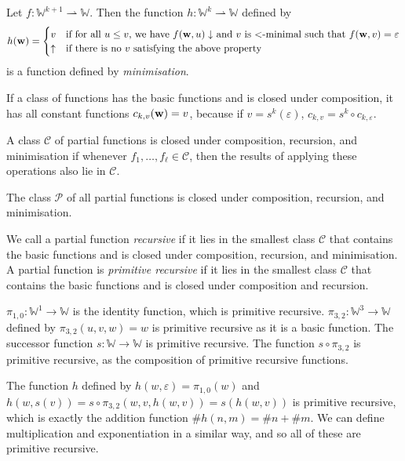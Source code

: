Let \( f \colon \mathbb W^{k+1} \rightharpoonup \mathbb W \).
Then the function \( h \colon \mathbb W^k \rightharpoonup \mathbb W \) defined by
\[ h(\vb w) = \begin{cases}
	v & \text{if for all \( u \leq v \), we have \( f(\vb w, u) \downarrow \) and \( v \) is \( < \)-minimal such that \( f(\vb w, v) = \varepsilon \)} \\
	\uparrow & \text{if there is no \( v \) satisfying the above property}
\end{cases} \]
is a function defined by \emph{minimisation}.
\begin{remark}
	If a class of functions has the basic functions and is closed under composition, it has all constant functions \( c_{k,v}(\vb w) = v \), because if \( v = s^k(\varepsilon) \), \( c_{k,v} = s^k \circ c_{k,\varepsilon} \).
\end{remark}
\begin{definition}
	A class \( \mathcal C \) of partial functions is closed under composition, recursion, and minimisation if whenever \( f_1, \dots, f_\ell \in \mathcal C \), then the results of applying these operations also lie in \( \mathcal C \).
\end{definition}
\begin{remark}
	The class \( \mathcal P \) of all partial functions is closed under composition, recursion, and minimisation.
\end{remark}
\begin{definition}
	We call a partial function \emph{recursive} if it lies in the smallest class \( \mathcal C \) that contains the basic functions and is closed under composition, recursion, and minimisation.
	A partial function is \emph{primitive recursive} if it lies in the smallest class \( \mathcal C \) that contains the basic functions and is closed under composition and recursion.
\end{definition}
\begin{example}
	\( \pi_{1,0} \colon \mathbb W^1 \to \mathbb W \) is the identity function, which is primitive recursive.
	\( \pi_{3,2} \colon \mathbb W^3 \to \mathbb W \) defined by \( \pi_{3,2}(u,v,w) = w \) is primitive recursive as it is a basic function.
	The successor function \( s \colon \mathbb W \to \mathbb W \) is primitive recursive.
	The function \( s \circ \pi_{3,2} \) is primitive recursive, as the composition of primitive recursive functions.

	The function \( h \) defined by \( h(w,\varepsilon) = \pi_{1,0}(w) \) and \( h(w,s(v)) = s \circ \pi_{3,2}(w,v,h(w,v)) = s(h(w,v)) \) is primitive recursive, which is exactly the addition function \( \# h(n,m) = \# n + \# m \).
	We can define multiplication and exponentiation in a similar way, and so all of these are primitive recursive.
\end{example}

